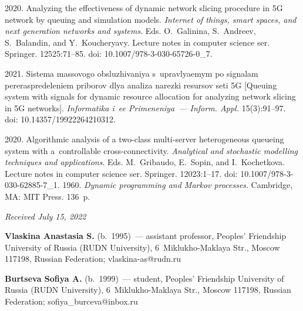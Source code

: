 \begin{multicols}{2}
{{\begin{thebibliography}{99}
   2020. 
Analyzing the effectiveness of dynamic network slicing procedure in 5G network by 
queuing and simulation models. \textit{Internet of things, smart spaces, and next 
generation networks and systems}. Eds. O.~Galinina, S.~Andreev, S.~Balandin, and 
Y.~Koucheryavy. Lecture notes in computer science ser. Springer. 12525:71--85. 
doi: 10.1007/978-3-030-65726-0\_7.

   2021. Sistema 
massovogo obsluzhivaniya s~upravlyaemym po signalam pereraspredeleniem 
priborov dlya analiza narezki resursov seti 5G [Queuing system with signals for 
dynamic resource allocation for analyzing network slicing in 5G networks]. 
\textit{Informatika i~ee Primeneniya~--- Inform. Appl.} 15(3):91--97. doi: 
10.14357/19922264210312.

   2020. 
Algorithmic analysis of a two-class multi-server heterogeneous queueing system with 
a~controllable cross-connectivity. \textit{Analytical and stochastic modelling 
techniques and applications}. Eds. M.~Gribaudo, E.~Sopin, and I.~Kochetkova. 
Lecture notes in computer science ser. Springer. 12023:1--17.  
doi: 10.1007/978-3-030-62885-7\_1.
   1960. \textit{Dynamic programming and Markov processes}. 
Cambridge, MA: MIT Press. 136~p.
  \end{thebibliography}

 }
 }

\end{multicols}

\vspace*{-6pt}

\hfill{\small\textit{Received July 15, 2022}}
  
  \Contr
  
  \noindent
  \textbf{Vlaskina Anastasia S.} (b.\ 1995)~--- assistant professor, Peoples' 
Friendship University of Russia (RUDN University), 6~Miklukho-Maklaya Str., 
Moscow 117198, Russian Federation; \mbox{vlaskina-as@rudn.ru}
  
  \vspace*{3pt}
  
  \noindent
  \textbf{Burtseva Sofiya A.} (b.\ 1999)~--- student, Peoples' Friendship University 
of Russia (RUDN University), 6~Miklukho-Maklaya Str., Moscow 117198, Russian 
Federation; \mbox{sofiya\_burceva@inbox.ru}
  
